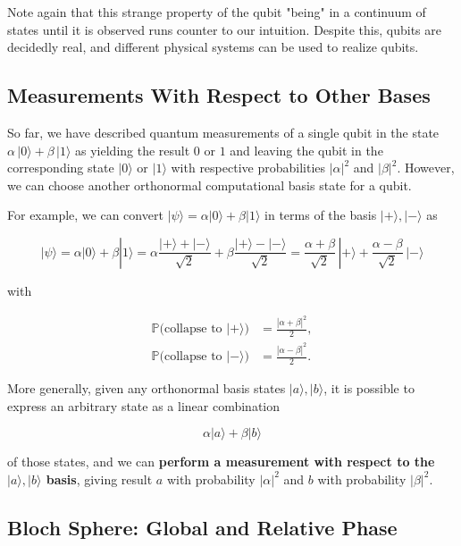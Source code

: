 \documentclass{article}
\theoremstyle{definition}
\begin{document}
    Note again that this strange property of the qubit "being" in a continuum of states until it is observed runs counter to our intuition. Despite this, qubits are decidedly real, and different physical systems can be used to realize qubits.

  \subsection{Measurements With Respect to Other Bases}

    So far, we have described quantum measurements of a single qubit in the state $\alpha\, |0\rangle + \beta \, |1 \rangle$ as yielding the result $0$ or $1$ and leaving the qubit in the corresponding state $|0\rangle$ or $|1\rangle$ with respective probabilities $|\alpha|^2$ and $|\beta|^2$. However, we can choose another orthonormal computational basis state for a qubit.

    For example, we can convert $|\psi \rangle = \alpha |0\rangle + \beta |1 \rangle$ in terms of the basis $|+\rangle, |-\rangle$ as

      \[|\psi \rangle = \alpha |0\rangle + \beta |1 \rangle = \alpha \frac{|+\rangle + |-\rangle}{\sqrt{2}} + \beta \frac{|+\rangle - |-\rangle}{\sqrt{2}} = \frac{\alpha + \beta}{\sqrt{2}} \, |+\rangle + \frac{\alpha - \beta}{\sqrt{2}} \, |-\rangle\]

    with

    \begin{align*}
      \mathbb{P} \big( \text{collapse to } |+\rangle \big) & = \frac{|\alpha + \beta|^2}{2}, \\
      \mathbb{P} \big( \text{collapse to } |-\rangle \big) & = \frac{|\alpha - \beta|^2}{2}.
    \end{align*}

    More generally, given any orthonormal basis states $|a \rangle, |b \rangle$, it is possible to express an arbitrary state as a linear combination

      \[ \alpha |a \rangle + \beta |b \rangle \]

    of those states, and we can \textbf{perform a measurement with respect to the $|a\rangle, |b\rangle$ basis}, giving result $a$ with probability $|\alpha|^2$ and $b$ with probability $|\beta|^2$.

  \subsection{Bloch Sphere: Global and Relative Phase}
\end{document}
